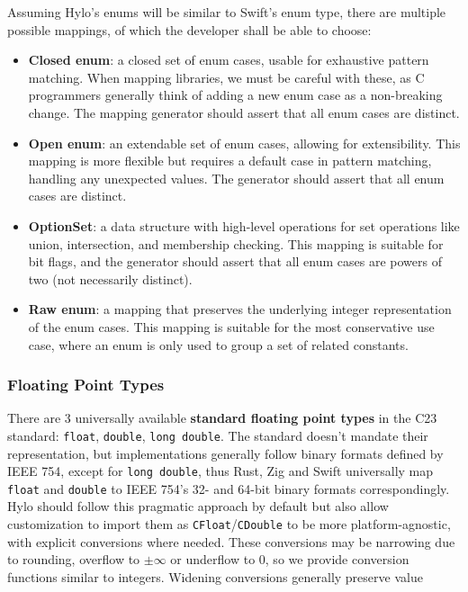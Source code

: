 Assuming Hylo's enums will be similar to Swift's enum type, there are multiple possible mappings, of which the developer shall be able to choose:
\begin{itemize}
    \item \textbf{Closed enum}: a closed set of enum cases, usable for exhaustive pattern matching. When mapping libraries, we must be careful with these, as C programmers generally think of adding a new enum case as a non-breaking change. The mapping generator should assert that all enum cases are distinct.
    \item \textbf{Open enum}: an extendable set of enum cases, allowing for extensibility. This mapping is more flexible but requires a default case in pattern matching, handling any unexpected values. The generator should assert that all enum cases are distinct.
    \item \textbf{OptionSet}: a data structure with high-level operations for set operations like union, intersection, and membership checking. This mapping is suitable for bit flags, and the generator should assert that all enum cases are powers of two (not necessarily distinct).
    \item \textbf{Raw enum}: a mapping that preserves the underlying integer representation of the enum cases. This mapping is suitable for the most conservative use case, where an enum is only used to group a set of related constants.
\end{itemize}

\subsubsection{Floating Point Types}
There are 3 universally available \textbf{standard floating point types} in the C23 standard: \texttt{float}, \texttt{double}, \texttt{long double}. The standard doesn't mandate their representation, but implementations generally follow\cite{llvm-float-support} binary formats defined by IEEE 754\cite{ieee754}, except for \texttt{long double}\cite{longdouble-wiki}\cite{weird-precision-support}, thus Rust, Zig and Swift universally map \texttt{float} and \texttt{double} to IEEE 754's 32- and 64-bit binary formats correspondingly. Hylo should follow this pragmatic approach by default but also allow customization to import them as \texttt{CFloat}/\texttt{CDouble} to be more platform-agnostic, with explicit conversions where needed. These conversions may be narrowing due to rounding, overflow to $\pm\infty$ or underflow to 0, so we provide conversion functions similar to integers. Widening conversions generally preserve value


